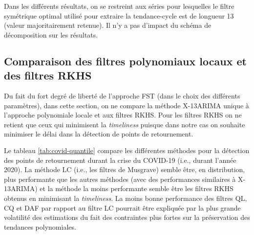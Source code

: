 \documentclass[
  11pt,
  french,
  a4paper]{article}
\newcommand\1{\mathds{1}}
\begin{document}
Dans les différents résultats, on se restreint aux séries pour lesquelles le filtre symétrique optimal utilisé pour extraire la tendance-cycle est de longueur 13 (valeur majoritairement retenue).
Il n'y a pas d'impact du schéma de décomposition sur les résultats.

\hypertarget{comparaison-des-filtres-polynomiaux-locaux-et-des-filtres-rkhs}{%
\subsection{Comparaison des filtres polynomiaux locaux et des filtres RKHS}\label{comparaison-des-filtres-polynomiaux-locaux-et-des-filtres-rkhs}}

Du fait du fort degré de liberté de l'approche FST (dans le choix des différents paramètres), dans cette section, on ne compare la méthode X-13ARIMA unique à l'approche polynomiale locale et aux filtres RKHS.
Pour les filtres RKHS on ne retient que ceux qui minimisent la \emph{timeliness} puisque dans notre cas on souhaite minimiser le délai dans la détection de points de retournement.

Le tableau \ref{tab:covid-quantile} compare les différentes méthodes pour la détection des points de retournement durant la crise du COVID-19 (i.e., durant l'année 2020).
La méthode LC (i.e., les filtres de Musgrave) semble être, en distribution, plus performante que les autres méthodes (avec des performances similaires à X-13ARIMA) et la méthode la moins performante semble être les filtres RKHS obtenus en minimisant la \emph{timeliness}.
La moins bonne performance des filtres QL, CQ et DAF par rapport au filtre LC pourrait être expliquée par la plus grande volatilité des estimations du fait des contraintes plus fortes sur la préservation des tendances polynomiales.
\end{document}
